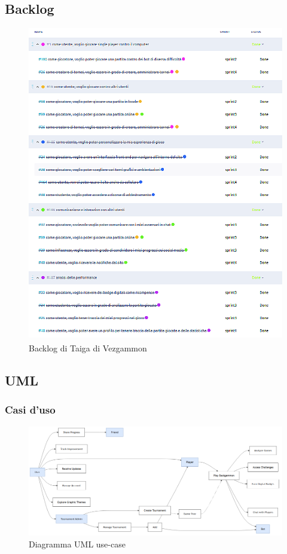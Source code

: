 \documentclass{article}
\begin{document}
\subsection{Backlog} \label{sec:bl}
\begin{figure}[H]
    \centering
    \includegraphics[width=1\textwidth]{backlog}
    \caption{Backlog di Taiga di Vezgammon\textsuperscript{\texttrademark}}
    \label{fig:backlog}
\end{figure}

\subsection{UML}
\subsubsection{Casi d'uso}

\vspace{70pt}

\begin{figure}[H]
    \centering
    \includegraphics[width=16cm]{uml-usecase}
    \caption{Diagramma UML use-case}
    \label{fig:use-case}
\end{figure}
\end{document}
